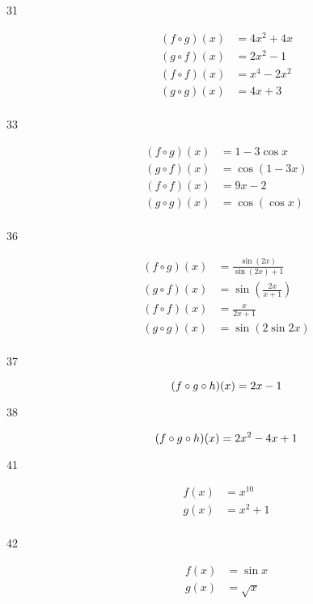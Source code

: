 \documentclass[letterpaper, landscape]{exam}
\begin{document}
    \begin{description}

      \item[31]
        \begin{align*}
          (f \circ g)(x) &= 4x^2 + 4x \\
          (g \circ f)(x) &= 2x^2 - 1 \\
          (f \circ f)(x) &= x^4 - 2x^2 \\
          (g \circ g)(x) &= 4x + 3 \\
        \end{align*}

      \item[33]
        \begin{align*}
          (f \circ g)(x) &= 1 - 3 \cos{x} \\
          (g \circ f)(x) &= \cos{ (1 - 3x) } \\
          (f \circ f)(x) &= 9x - 2 \\
          (g \circ g)(x) &= \cos { (\cos { x }) } \\
        \end{align*}

      \item[36]
        \begin{align*}
          (f \circ g)(x) &= \frac{\sin (2 x) }{\sin (2 x) +1} \\
          (g \circ f)(x) &= \sin \left( \frac{ 2x }{x+1} \right) \\
          (f \circ f)(x) &= \frac{x}{2x + 1} \\
          (g \circ g)(x) &= \sin ( 2 \sin 2x) \\
        \end{align*}

      \item[37]
        \[
          (f \circ g \circ h)(x) = 2x - 1 \\
        \]
  
      \item[38]
        \[
          (f \circ g \circ h)(x) = 2 x^2-4 x+1 \\
        \]
  
      \item[41]
        \begin{align*}
          f(x) &= x^{10} \\
          g(x) &= x^2 + 1 \\
        \end{align*}

      \item[42]
        \begin{align*}
          f(x) &= \sin x \\
          g(x) &= \sqrt{x} \\
        \end{align*}


\end{description}
\end{document}
